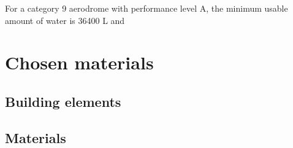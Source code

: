 	For a category 9 aerodrome with performance level A, the minimum usable amount of water is 36400 L and 

\section{Chosen materials}
		\subsection{Building elements}
		\subsection{Materials}